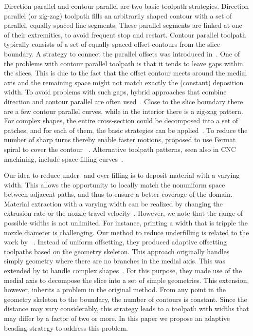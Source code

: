 Direction parallel and contour parallel are two basic toolpath strategies.
Direction parallel (or zig-zag) toolpath fills an arbitrarily shaped contour with a set of parallel, equally spaced line segments.
These parallel segments are linked at one of their extremities, to avoid frequent stop and restart.
Contour parallel toolpath typically consists of a set of equally spaced offset contours from the slice boundary.
A strategy to connect the parallel offsets was introduced in~\cite{KUIPERS2019CAD}.
One of the problems with contour parallel toolpath is that it tends to leave gaps within the slices.
This is due to the fact that the offset contour meets around the medial axis and the remaining space might not match exactly the (constant) deposition width.
To avoid problems with such gaps, hybrid approaches that combine direction and contour parallel are often used~\cite{Mcmains2000DETC,Jin2013adaptive}.
Close to the slice boundary there are a few contour parallel curves, while in the interior there is a zig-zag pattern.
For complex shapes, the entire cross-section could be decomposed into a set of patches, and for each of them, the basic strategies can be applied~\cite{Ding2014,Jin2017JCIM}.
To reduce the number of sharp turns thereby enable faster motions, \citeauthor{Zhao2016} proposed to use Fermat spiral to cover the contour ~\cite{Zhao2016}.
Alternative toolpath patterns, seen also in CNC machining, include space-filling curves~\cite{Cox1994CAD,Griffiths1994,Shaikh2016}.

Our idea to reduce under- and over-filling is to deposit material with a varying width.
This allows the opportunity to locally match the nonuniform space between adjacent paths, and thus to ensure a better coverage of the domain.
Material extraction with a varying width can be realized by changing the extrusion rate or the nozzle travel velocity~\cite{Ertay2018,Kuipers2018}.
However, we note that the range of possible widths is not unlimited.
For instance, printing a width that is tripple the nozzle diameter is challenging.
Our method to reduce underfilling is related to the work by \citeauthor{kao1998optimal}~\cite{kao1998optimal}.
Instead of uniform offsetting, they produced adaptive offsetting toolpaths based on the geometry skeleton.
This approach originally handles simply geometry where there are no branches in the medial axis.
This was extended by \citeauthor{Ding2016a} to handle complex shapes~\cite{Ding2016a}.
For this purpose, they made use of the medial axis to decompose the slice into a set of simple geometries.
This extension, however, inherits a problem in the original method.
From any point in the geometry skeleton to the boundary, the number of contours is constant.
Since the distance may vary considerably, this strategy leads to a toolpath with widths that may differ by a factor of two or more.
In this paper we propose an adaptive beading strategy to address this problem.

